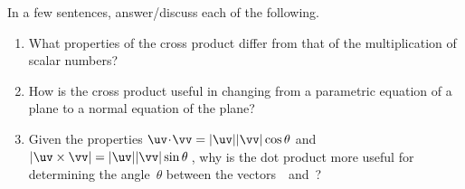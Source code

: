 \begin{exercise}  
In a few sentences, answer\slash discuss each of the following.
\begin{enumerate}
\item What properties of the cross product differ from that of the multiplication of scalar numbers?  

\item How is the cross product useful in changing from a parametric equation of a plane to a normal equation of the plane?

\item Given the properties \(\uv\cdot\vv=|\uv||\vv|\cos\theta\) and \(|\uv\times\vv|=|\uv||\vv|\sin\theta\)\,, why is the dot product more useful for determining the angle~\(\theta\) between the vectors~\uv\ and~\vv?

\end{enumerate}
\end{exercise}

\begin{comment}%
why, what caused X?
how did X occur?
what-if? what-if-not?
how does X compare with Y?
what is the evidence for X?
why is X important?
\end{comment}
